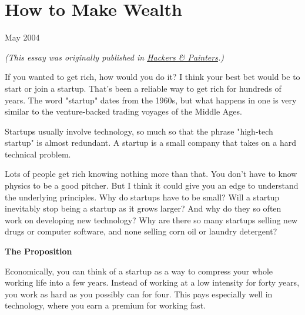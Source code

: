 \chapter{How to Make Wealth}


            
              
                


                  
                    May 2004

\emph{
                      (This essay was originally published in
                      \href{http://www.amazon.com/gp/product/0596006624/104-0572701-7443937}{Hackers \& Painters}.) }

If you wanted to get rich, how would you do it?
                    I think your best bet would be to start or join a startup.
                    That's been a reliable way to get rich for hundreds of
                    years. The word "startup" dates from the 1960s, but what
                    happens in one is very similar to the venture-backed trading
                    voyages of the Middle Ages.

Startups usually
                    involve technology, so much so that the phrase "high-tech
                    startup" is almost redundant. A startup is a small company
                    that takes on a hard technical problem.

Lots of
                    people get rich knowing nothing more than that. You don't
                    have to know physics to be a good pitcher. But I think it
                    could give you an edge to understand the underlying
                    principles. Why do startups have to be small? Will a startup
                    inevitably stop being a startup as it grows larger? And why
                    do they so often work on developing new technology? Why are
                    there so many startups selling new drugs or computer
                    software, and none selling corn oil or laundry detergent?

\textbf{The Proposition}

Economically, you can think of a startup as a
                    way to compress your whole working life into a few years.
                    Instead of working at a low intensity for forty years, you
                    work as hard as you possibly can for four. This pays
                    especially well in technology, where you earn a premium for
                    working fast.

